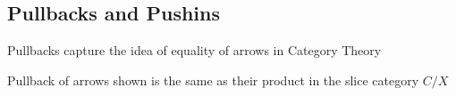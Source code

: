 \documentclass[../../notes.tex]{subfiles}
\begin{document}
\subsection{Pullbacks and Pushins}

Pullbacks capture the idea of equality of arrows in Category Theory
Pullback of arrows shown is the same as their product in the slice category $C/X$
\end{document}
